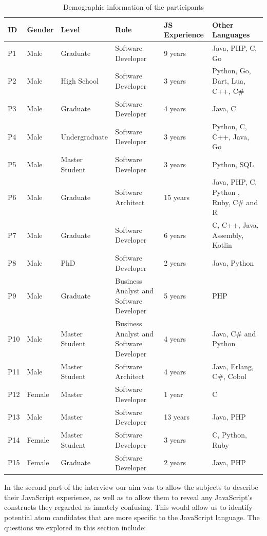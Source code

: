 \begin{table}[htb!]
\centering
\begin{tabular}
{p{0.4cm}p{0.9cm}p{2.0cm}p{6cm}p{1.9cm} p{4.5cm}}
\toprule
ID & Gender & Level & Role & JS Experience & Other Languages \\ \midrule 
P1 & Male & Graduate & Software Developer & 9 years & Java, PHP, C, Go  
\\ 
P2 & Male & High School & Software Developer & 3 years & Python, Go, Dart, Lua, C++, C\#
\\ 
P3 & Male & Graduate & Software Developer & 4 years & Java, C
\\ 
P4 & Male & Undergraduate & Software Developer & 3 years & Python, C, C++, Java, Go
\\ 
P5 & Male & Master Student & Software Developer & 3 years & Python, SQL
\\ 
P6 & Male & Graduate & Software Architect  & 15  years  & Java, PHP, C, Python , Ruby, C\# and R
\\ 
P7 & Male & Graduate & Software Developer  & 6 years & C, C++, Java, Assembly, Kotlin
\\ 
P8 & Male & PhD & Software Developer & 2 years & Java, Python
\\ 
P9 & Male & Graduate & Business Analyst and Software Developer & 5 years & PHP
\\ 
P10 & Male & Master Student & Business Analyst and Software Developer  & 4 years & Java, C\# and Python
\\ 
P11 & Male & Master Student & Software Architect & 4 years & Java, Erlang, C\#, Cobol
\\ 
P12 & Female & Master & Software Developer  & 1 year & C
\\ 
P13 & Male & Master & Software Developer & 13 years & Java, PHP
\\ 
P14 & Female & Master Student & Software Developer  & 3 years & C, Python, Ruby
\\ 
P15 & Female &  Graduate & Software Developer & 2 years & Java, PHP
\\ \bottomrule
\end{tabular}
    \caption{Demographic information of the participants}
    \label{pinterview}
\end{table}

In the second part of the interview our aim was to allow the subjects to describe
their JavaScript experience, as well as to allow them to reveal any JavaScript's constructs they regarded as innately confusing. This would allow us to identify potential atom candidates that are more specific to the JavaScript language. The questions we explored in this section include:

